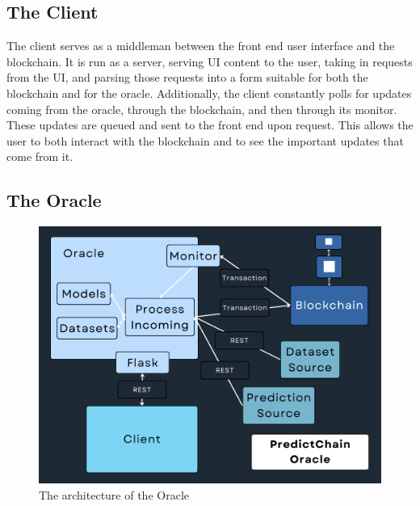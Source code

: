 \documentclass{article}
\begin{document}
    \subsection{The Client}

    The client serves as a middleman between the front end user interface and the blockchain.  It is run as a server,
    serving UI content to the user, taking in requests from the UI, and parsing those requests into a form suitable for
    both the blockchain and for the oracle.  Additionally, the client constantly polls for updates coming from the oracle,
    through the blockchain, and then through its monitor.  These updates are queued and sent to the front end upon request.
    This allows the user to both interact with the blockchain and to see the important updates that come from it.

    \subsection{The Oracle}

    \begin{figure}[H]
        \begin{center}
            \begin{minipage}{0.6\textwidth}
            \centering
            \includegraphics[width=\linewidth]{../../img/oracleDiagram}
            \caption{The architecture of the Oracle}\label{Fig:oracleDiagram}
        \end{minipage}\hfill
        \end{center}
    \end{figure}
\end{document}
